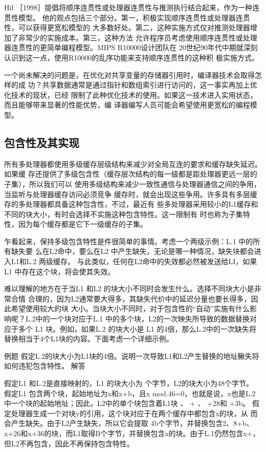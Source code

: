 Hil ［1998］提倡将顺序连贯性或处理器连贯性与推测执行结合起来，作为一种连贯性模型。
他的观点包括三个部分。第一，积极实现顺序连贯性或处理器连贯性，可以获得更宽松模型的
大多数好处。第二，这种实施方式仅对推测处理器增加了非常少的实施成本。第三，这种方法
允许程序员考虑使用顺序连贯性或处理器连贯性的更简单编程模型。MIPS R10000设计团队在
20世纪90年代中期就深刻认识到这一点，使用R10000的乱序功能来支持顺序连贯性的这种积
极实施方式。

一个尚未解决的问题是，在优化对共享变量的存储器引用时，编译器技术会取得怎样的成
功？共享数据通常是通过指针和数组索引进行访问的，这一事实再加上优化技术的现状，已经
限制了此种优化技术的使用。如果这一技术进入实用状态，而且能够带来显著的性能优势，编
译器编写人员可能会希望使用更宽松的编程模型。

\subsection{包含性及其实现}
所有多处理器都使用多级缓存层级结构来减少对全局互连的要求和缓存缺失延迟。如果缓
存还提供了多级包含性（缓存层次结构的每一级都是距处理器更远一层的子集），所以我们可以
使用多级结构来减少一致性通信与处理器通信之间的争用，当监听与处理器缓存访问必须竞争
缓存时，就会出现这些争用。许多具有多层缓存的多处理器都具备这种包含性，不过，最近有
些多处理器采用较小的L1缓存和不同的块大小，有时会选择不实施这种包含特性。这一限制有
时也称为子集特性，因为每个缓存都是它下一级缓存的子集。

乍看起来，保持多级包含特性是件很简单的事情。考虑一个两级示例：L.1 中的所有缺失要
么在L2命中，要么在L2 中产生缺失，无论是哪一种情况，缺失块都会进入L1和L.2 两级缓存。
与此类似，任何在L2命中的失效都必然被发送给LI，如果L1 中存在这个块，将会使其失效。

难以理解的地方在于当L1 和L2 的块大小不同时会发生什么。选择不同块大小是非常合情
合理的，因为L2通常要大得多，其缺失代价中的延迟分量也要长得多，因此希望使用较大的块
大小。当块大小不同时，对于包含性的“自动”实施有什么影响呢？L.2中的一个块对应于L.1
中的多个块，L2的一次映失所导致的数据替换对应于多个 L1 块。例如，如果L.2 的块大小是
L1 的4倍，那么L.2中的一次缺失将替换相当于4个L1块的内容。下面考虑一个详细示例。

例题
假定L.2的块大小为L1块的4倍。说明一次导致L1和L2产生替换的地址鳅失将
如何违犯包含特性。
解答

假定L1 和L.2是直接映射的，L1 的块大小为 个字节，L2的块大小为48个字节。
假定L1 包含两个块，起始地址为x和x+b，且x mod.46=0，也就是说，x也是L.2
中一个块的起始地址；因此，L2中的单个块包含着L1块 、 + 、 +28和 +3b。
假定处理器生成一个对块y的引用，这个块对应于在两个缓存中都包含x的块，从
而会产生缺失。由于L2产生缺失，所以它会提取 4b个字节，并替换包含2、8+b、
x+26和x+36的块，而L1取得B个字节，并替换包含x的块。由于L.1仍然包含x+，
但L2不再包含，因此不再保持包含特性。

